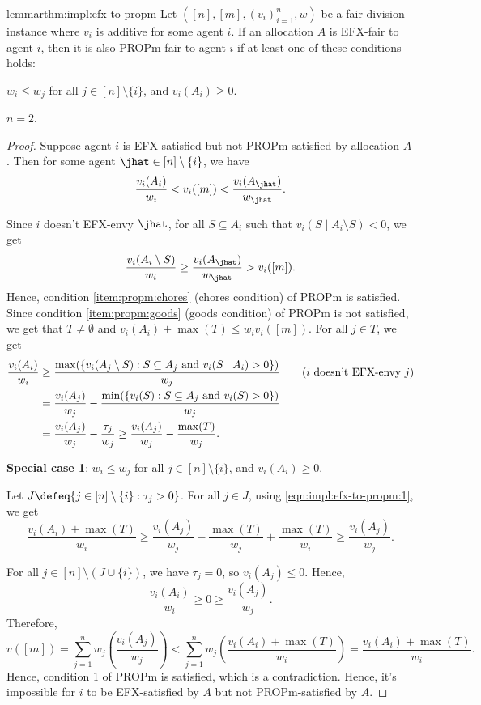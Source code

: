 \begin{restatable}{lemma}{rthm:impl:efx-to-propm}
\label{thm:impl:efx-to-propm}
Let $([n], [m], (v_i)_{i=1}^n, w)$ be a fair division instance
where $v_i$ is additive for some agent $i$.
If an allocation $A$ is EFX-fair to agent $i$, then it is also PROPm-fair to agent $i$
if at least one of these conditions holds:
\begin{tightenum}
\item $w_i \le w_j$ for all $j \in [n] \setminus \{i\}$, and $v_i(A_i) \ge 0$.
\item $n=2$.
\end{tightenum}
\end{restatable}
\begin{proof}
Suppose agent $i$ is EFX-satisfied but not PROPm-satisfied by allocation $A$.
Then for some agent $\jhat \in [n] \setminus \{i\}$, we have
\[ \frac{v_i(A_i)}{w_i} < v_i([m]) < \frac{v_i(A_{\jhat})}{w_{\jhat}}. \]

Since $i$ doesn't EFX-envy $\jhat$, for all $S \subseteq A_i$ such that
$v_i(S \mid A_i \setminus S) < 0$, we get
\[ \frac{v_i(A_i \setminus S)}{w_i} \ge \frac{v_i(A_{\jhat})}{w_{\jhat}} > v_i([m]). \]
Hence, condition \ref{item:propm:chores} (chores condition) of PROPm is satisfied.
Since condition \ref{item:propm:goods} (goods condition) of PROPm is not satisfied, we get that
$T \neq \emptyset$ and $v_i(A_i) + \max(T) \le w_iv_i([m])$.
%
For all $j \in T$, we get
\begin{align}
\frac{v_i(A_i)}{w_i} &\ge \frac{\max(\{v_i(A_j \setminus S): S \subseteq A_j \textrm{ and } v_i(S \mid A_i) > 0\})}{w_j}
    \tag{$i$ doesn't EFX-envy $j$}
\\ &= \frac{v_i(A_j)}{w_j} - \frac{\min(\{v_i(S): S \subseteq A_j \textrm{ and } v_i(S) > 0\})}{w_j}
    \notag
\\ &= \frac{v_i(A_j)}{w_j} - \frac{\tau_j}{w_j} \ge \frac{v_i(A_j)}{w_j} - \frac{\max(T)}{w_j}.
    \label{eqn:impl:efx-to-propm:1}
\end{align}

\textbf{Special case 1}: $w_i \le w_j$ for all $j \in [n] \setminus \{i\}$, and $v_i(A_i) \ge 0$.

Let $J \defeq \{j \in [n] \setminus \{i\}: \tau_j > 0\}$.
For all $j \in J$, using \eqref{eqn:impl:efx-to-propm:1}, we get
\[ \frac{v_i(A_i) + \max(T)}{w_i}
\ge \frac{v_i(A_j)}{w_j} - \frac{\max(T)}{w_j} + \frac{\max(T)}{w_i}
\ge \frac{v_i(A_j)}{w_j}. \]

For all $j \in [n] \setminus (J \cup \{i\})$, we have $\tau_j = 0$, so $v_i(A_j) \le 0$. Hence,
\[ \frac{v_i(A_i)}{w_i} \ge 0 \ge \frac{v_i(A_j)}{w_j}. \]
Therefore,
\[ v([m]) = \sum_{j=1}^n w_j\left(\frac{v_i(A_j)}{w_j}\right)
    < \sum_{j=1}^n w_j\left(\frac{v_i(A_i) + \max(T)}{w_i}\right)
    = \frac{v_i(A_i) + \max(T)}{w_i}. \]
Hence, condition 1 of PROPm is satisfied, which is a contradiction.
Hence, it's impossible for $i$ to be EFX-satisfied by $A$ but not PROPm-satisfied by $A$.


\end{proof}
